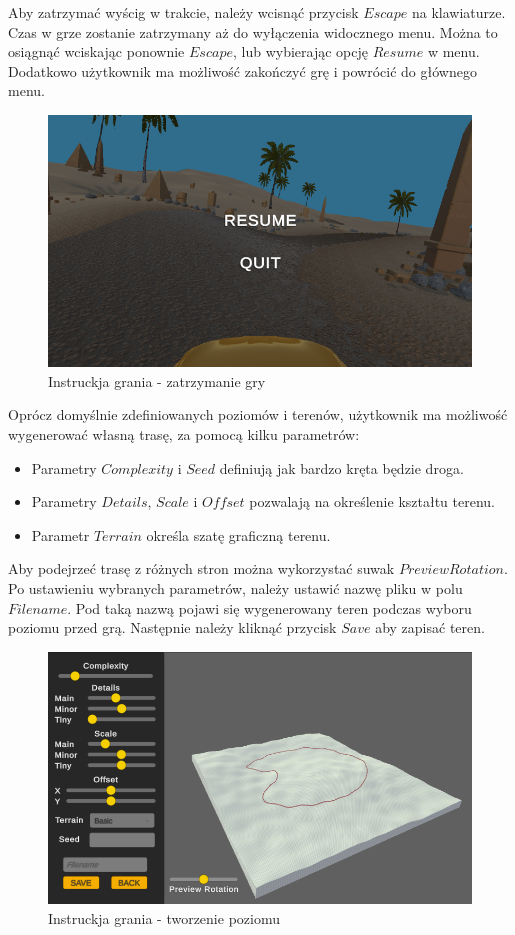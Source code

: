     Aby zatrzymać wyścig w trakcie, należy wcisnąć przycisk $Escape$ na klawiaturze. Czas w grze zostanie zatrzymany aż do wyłączenia widocznego menu.
    Można to osiągnąć wciskając ponownie $Escape$, lub wybierając opcję $Resume$ w menu. Dodatkowo użytkownik ma możliwość zakończyć grę i powrócić
    do głównego menu.
    \begin{figure}[H]
        \centering
        \includegraphics[width=.6\textwidth]{figures/game_instruction_pause.png}
        \caption{Instruckja grania - zatrzymanie gry}
        \label{fig}
    \end{figure}
    \clearpage
    Oprócz domyślnie zdefiniowanych poziomów i terenów, użytkownik ma możliwość wygenerować własną trasę, za pomocą kilku parametrów:
    \begin{itemize}
        \item Parametry $Complexity$ i $Seed$ definiują jak bardzo kręta będzie droga.
        \item Parametry $Details$, $Scale$ i $Offset$ pozwalają na określenie kształtu terenu.
        \item Parametr $Terrain$ określa szatę graficzną terenu.
    \end{itemize}
    Aby podejrzeć trasę z różnych stron można wykorzystać suwak $Preview Rotation$.\\
    Po ustawieniu wybranych parametrów, należy ustawić nazwę pliku w polu $Filename$. Pod taką nazwą pojawi się 
    wygenerowany teren podczas wyboru poziomu przed grą. Następnie należy kliknąć przycisk $Save$ aby zapisać teren.
    \begin{figure}[H]
        \centering
        \includegraphics[width=.7\textwidth]{figures/game_instruction_create.png}
        \caption{Instruckja grania - tworzenie poziomu}
        \label{fig}
    \end{figure}